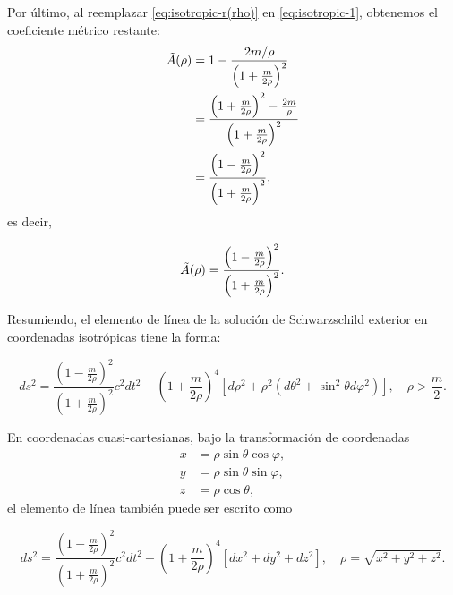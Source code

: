 \documentclass[letterpaper,11pt]{article}
\begin{document}
Por último, al reemplazar \eqref{eq:isotropic-r(rho)} en \eqref{eq:isotropic-1}, obtenemos el coeficiente métrico restante:
\begin{align}
    \Tilde{A}(\rho) &= 1 - \frac{2m/\rho}{\left( 1 + \frac{m}{2\rho}\right)^2} \nonumber \\
    &= \frac{\left( 1 + \frac{m}{2\rho}\right)^2 - \frac{2m}{\rho}}{\left( 1 + \frac{m}{2\rho}\right)^2}\nonumber\\
    &= \frac{\left(1 - \frac{m}{2\rho} \right)^2}{\left( 1 + \frac{m}{2\rho}\right)^2},
\end{align}
es decir,
\begin{shaded}
    \begin{equation}
        \Tilde{A}(\rho) = \frac{\left(1 - \frac{m}{2\rho} \right)^2}{\left( 1 + \frac{m}{2\rho}\right)^2}. 
    \end{equation}
\end{shaded}

Resumiendo, el elemento de línea de la solución de Schwarzschild exterior en coordenadas isotrópicas tiene la forma:
\begin{shaded}
    \begin{equation} \label{eq:metric-Schwarz-isotropic-sphere}
        ds^2 = \frac{\left(1 - \frac{m}{2\rho} \right)^2}{\left( 1 + \frac{m}{2\rho}\right)^2} c^2 dt^2 - \left( 1 + \frac{m}{2\rho} \right)^4 \left[d\rho^2 + \rho^2 (d\theta^2 + \sin^2\theta d\varphi^2)\right], \quad \rho > \frac{m}{2}.
    \end{equation}
\end{shaded}

En coordenadas cuasi-cartesianas, bajo la transformación de coordenadas
\begin{align}
    x &= \rho \sin\theta \cos\varphi, \label{eq:esferica-carte-1} \\
    y &= \rho \sin\theta \sin\varphi, \label{eq:esferica-carte-2}\\
    z &= \rho \cos\theta, \label{eq:esferica-carte-3}
\end{align}
el elemento de línea también puede ser escrito como
\begin{shaded}
    \begin{equation}\label{eq:metric-Schwarz-isotropic-carte}
        ds^2 = \frac{\left(1 - \frac{m}{2\rho} \right)^2}{\left( 1 + \frac{m}{2\rho}\right)^2} c^2 dt^2 - \left( 1 + \frac{m}{2\rho} \right)^4 \left[dx^2 + dy^2 + dz^2\right], \quad \rho = \sqrt{x^2 + y^2 + z^2}.
    \end{equation}
\end{shaded}
\end{document}
